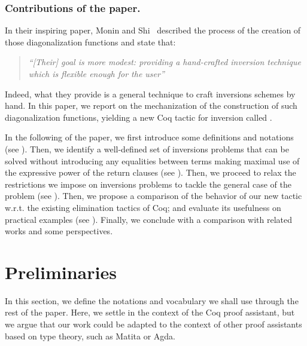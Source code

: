 \documentclass{llncs}
\begin{document}
\subsubsection{Contributions of the paper.} 
In their inspiring paper, Monin and Shi~\cite{monin-shi} described the
process of the creation of those diagonalization functions and state
that:
\begin{quote}
  \em ``[Their] goal is more modest: providing a hand-crafted inversion technique which is flexible enough for the user'' \end{quote} 
%
Indeed, what they provide is a general technique to craft inversions
schemes by hand.  In this paper, we report on the mechanization of the
construction of such diagonalization functions, yielding a new Coq
tactic for inversion called .

In the following of the paper, we first introduce some definitions and
notations (see ).
%
Then, we identify a well-defined set of inversions problems that can
be solved without introducing any equalities between terms making
maximal use of the expressive power of the return clauses (see
\secref{}).
%
Then, we proceed to relax the restrictions we impose on inversions
problems to tackle the general case of the problem (see \secref{}).
%
Then, we propose a comparison of the behavior of our new 
tactic w.r.t. the existing elimination tactics of Coq; and evaluate
its usefulness on practical examples (see \secref{}).
%
Finally, we conclude with a comparison with related works and some
perspectives. 

\section{Preliminaries}\label{sec:preliminaries}
In this section, we define the notations and vocabulary we shall use
through the rest of the paper. Here, we settle in the context of the
Coq proof assistant, but we argue that our work could be adapted to
the context of other proof assistants based on type theory, such as
Matita or Agda.
\end{document}
